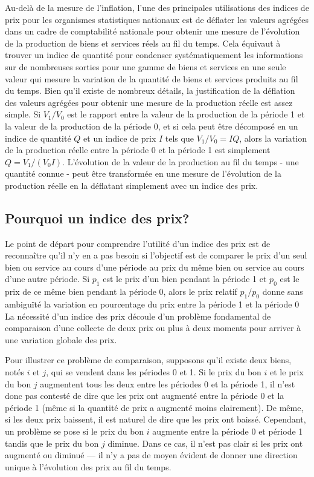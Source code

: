 \documentclass[]{article}
\begin{document}
Au-delà de la mesure de l'inflation, l'une des principales utilisations des indices de prix pour les organismes statistiques nationaux est de déflater les valeurs agrégées dans un cadre de comptabilité nationale pour obtenir une mesure de l'évolution de la production de biens et services réels au fil du temps. Cela équivaut à trouver un indice de quantité pour condenser systématiquement les informations sur de nombreuses sorties pour une gamme de biens et services en une seule valeur qui mesure la variation de la quantité de biens et services produits au fil du temps. Bien qu'il existe de nombreux détails, la justification de la déflation des valeurs agrégées pour obtenir une mesure de la production réelle est assez simple. Si \(V_1 / V_0\) est le rapport entre la valeur de la production de la période 1 et la valeur de la production de la période 0, et si cela peut être décomposé en un indice de quantité \(Q\) et un indice de prix \(I\) tels que \(V_1 / V_0 = IQ\), alors la variation de la production réelle entre la période 0 et la période 1 est simplement \(Q = V_1 / (V_0 I)\). L'évolution de la valeur de la production au fil du temps - une quantité connue - peut être transformée en une mesure de l'évolution de la production réelle en la déflatant simplement avec un indice des prix.

\hypertarget{pourquoi-un-indice-des-prix}{%
\subsection{Pourquoi un indice des prix?}\label{pourquoi-un-indice-des-prix}}

Le point de départ pour comprendre l'utilité d'un indice des prix est de reconnaître qu'il n'y en a pas besoin si l'objectif est de comparer le prix d'un seul bien ou service au cours d'une période au prix du même bien ou service au cours d'une autre période. Si \(p_1\) est le prix d'un bien pendant la période 1 et \(p_0\) est le prix de ce même bien pendant la période 0, alors le prix relatif \(p_1 / p_0\) donne sans ambiguïté la variation en pourcentage du prix entre la période 1 et la période 0 La nécessité d'un indice des prix découle d'un problème fondamental de comparaison d'une collecte de deux prix ou plus à deux moments pour arriver à une variation globale des prix.

Pour illustrer ce problème de comparaison, supposons qu'il existe deux biens, notés \(i\) et \(j\), qui se vendent dans les périodes 0 et 1. Si le prix du bon \(i\) et le prix du bon \(j\) augmentent tous les deux entre les périodes 0 et la période 1, il n'est donc pas contesté de dire que les prix ont augmenté entre la période 0 et la période 1 (même si la quantité de prix a augmenté moins clairement). De même, si les deux prix baissent, il est naturel de dire que les prix ont baissé. Cependant, un problème se pose si le prix du bon \(i\) augmente entre la période 0 et
période 1 tandis que le prix du bon \(j\) diminue. Dans ce cas, il n'est pas clair si les prix ont augmenté ou diminué --- il n'y a pas de moyen évident de donner une direction unique à l'évolution des prix au fil du temps.
\end{document}
